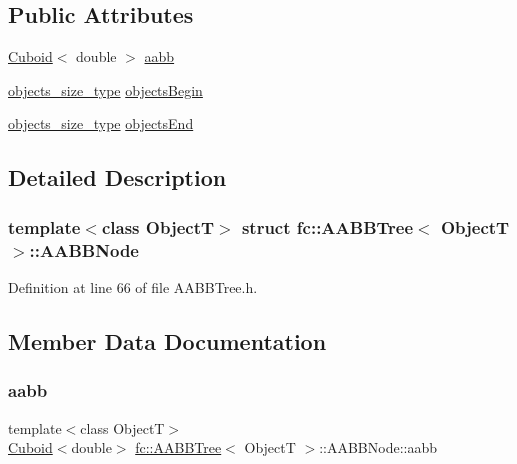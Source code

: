 \subsection*{Public Attributes}
\begin{DoxyCompactItemize}
\item 
\hyperlink{classfc_1_1Cuboid}{Cuboid}$<$ double $>$ \hyperlink{structfc_1_1AABBTree_1_1AABBNode_ac4016fa848e48a4270fc1f4ceb0cfec8}{aabb}
\item 
\hyperlink{classfc_1_1AABBTree_a3333c421c1fa34841043bd8545de8ea8}{objects\+\_\+size\+\_\+type} \hyperlink{structfc_1_1AABBTree_1_1AABBNode_a705257db430984c00801167f5a561970}{objects\+Begin}
\item 
\hyperlink{classfc_1_1AABBTree_a3333c421c1fa34841043bd8545de8ea8}{objects\+\_\+size\+\_\+type} \hyperlink{structfc_1_1AABBTree_1_1AABBNode_a4033832124c05f502e35f7ffdb5abc56}{objects\+End}
\end{DoxyCompactItemize}


\subsection{Detailed Description}
\subsubsection*{template$<$class ObjectT$>$\newline
struct fc\+::\+A\+A\+B\+B\+Tree$<$ Object\+T $>$\+::\+A\+A\+B\+B\+Node}



Definition at line 66 of file A\+A\+B\+B\+Tree.\+h.



\subsection{Member Data Documentation}
\mbox{\label{structfc_1_1AABBTree_1_1AABBNode_ac4016fa848e48a4270fc1f4ceb0cfec8}} 
\subsubsection{\texorpdfstring{aabb}{aabb}}
{\footnotesize\ttfamily template$<$class ObjectT$>$ \\
\hyperlink{classfc_1_1Cuboid}{Cuboid}$<$double$>$ \hyperlink{classfc_1_1AABBTree}{fc\+::\+A\+A\+B\+B\+Tree}$<$ ObjectT $>$\+::A\+A\+B\+B\+Node\+::aabb}




